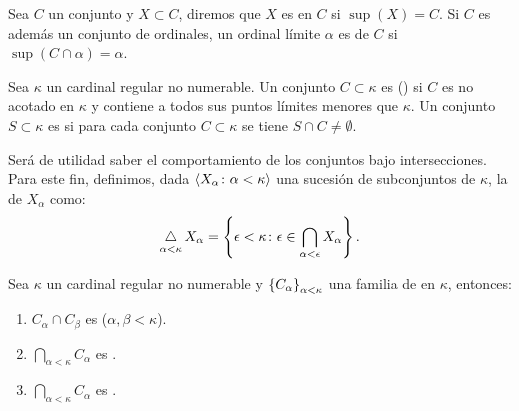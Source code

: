 Sea $C$ un conjunto y $X\subset C$, diremos que $X$ es 
en $C$ si $\sup(X) = C$.
Si $C$ es además un conjunto de ordinales, un ordinal límite $\alpha$ es
 de $C$ si $\sup ( C \cap\alpha ) = \alpha$.
\begin{defi}
    Sea $\kappa$ un cardinal regular no numerable. Un conjunto $C\subset \kappa$
    es  (\cna) si $C$ es no acotado en $\kappa$ y contiene a
    todos sus puntos límites menores que $\kappa$.
    Un conjunto $S\subset\kappa$ es  si para cada conjunto
    \cna{} $C\subset\kappa$ se tiene $S\cap C\neq\emptyset$.
\end{defi}

Será de utilidad saber el comportamiento de los conjuntos \cna{} bajo intersecciones.
Para este fin, definimos, dada $\langle X_\alpha\colon \alpha<\kappa \rangle$ una sucesión
de subconjuntos de $\kappa$, la  de
$X_\alpha$ como:
\[
    \operatorname*{\bigtriangleup}_{\alpha<\kappa}X_\alpha
    =
    \left\{ \epsilon<\kappa\colon\epsilon\in \bigcap_{\alpha<\epsilon}X_\alpha \right\} .
\]

\begin{teo}\label{teo:intersection-cna}
    Sea $\kappa$ un cardinal regular no numerable y $\left\{ C_\alpha \right\}_{\alpha<\kappa}$ una familia
    de \cna{} en $\kappa$, entonces:
    \begin{enumerate}[label=\alph*)]
        \item $C_\alpha\cap C_\beta$ es \cna{} ($\alpha,\beta < \kappa$).
        \item $\bigcap_{\alpha<\kappa}C_\alpha$ es \cna.
        \item $\dint_{\alpha<\kappa}C_\alpha$ es \cna.
    \end{enumerate}
\end{teo}


